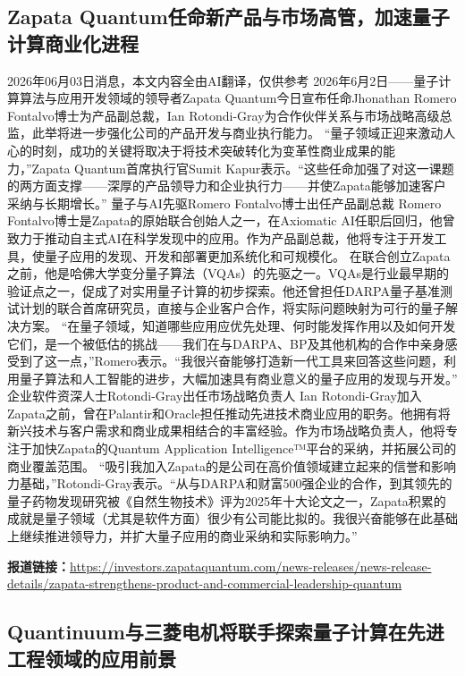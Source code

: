 \documentclass[12pt,a4paper]{ctexart}
\begin{document}
\subsection{ Zapata Quantum任命新产品与市场高管，加速量子计算商业化进程 }

2026年06月03日消息，本文内容全由AI翻译，仅供参考
2026年6月2日——量子计算算法与应用开发领域的领导者Zapata Quantum今日宣布任命Jhonathan Romero Fontalvo博士为产品副总裁，Ian Rotondi-Gray为合作伙伴关系与市场战略高级总监，此举将进一步强化公司的产品开发与商业执行能力。
“量子领域正迎来激动人心的时刻，成功的关键将取决于将技术突破转化为变革性商业成果的能力，”Zapata Quantum首席执行官Sumit Kapur表示。“这些任命加强了对这一课题的两方面支撑——深厚的产品领导力和企业执行力——并使Zapata能够加速客户采纳与长期增长。”
量子与AI先驱Romero Fontalvo博士出任产品副总裁
Romero Fontalvo博士是Zapata的原始联合创始人之一，在Axiomatic AI任职后回归，他曾致力于推动自主式AI在科学发现中的应用。作为产品副总裁，他将专注于开发工具，使量子应用的发现、开发和部署更加系统化和可规模化。
在联合创立Zapata之前，他是哈佛大学变分量子算法（VQAs）的先驱之一。VQAs是行业最早期的验证点之一，促成了对实用量子计算的初步探索。他还曾担任DARPA量子基准测试计划的联合首席研究员，直接与企业客户合作，将实际问题映射为可行的量子解决方案。
“在量子领域，知道哪些应用应优先处理、何时能发挥作用以及如何开发它们，是一个被低估的挑战——我们在与DARPA、BP及其他机构的合作中亲身感受到了这一点，”Romero表示。“我很兴奋能够打造新一代工具来回答这些问题，利用量子算法和人工智能的进步，大幅加速具有商业意义的量子应用的发现与开发。”
企业软件资深人士Rotondi-Gray出任市场战略负责人
Ian Rotondi-Gray加入Zapata之前，曾在Palantir和Oracle担任推动先进技术商业应用的职务。他拥有将新兴技术与客户需求和商业成果相结合的丰富经验。作为市场战略负责人，他将专注于加快Zapata的Quantum Application Intelligence™平台的采纳，并拓展公司的商业覆盖范围。
“吸引我加入Zapata的是公司在高价值领域建立起来的信誉和影响力基础，”Rotondi-Gray表示。“从与DARPA和财富500强企业的合作，到其领先的量子药物发现研究被《自然生物技术》评为2025年十大论文之一，Zapata积累的成就是量子领域（尤其是软件方面）很少有公司能比拟的。我很兴奋能够在此基础上继续推进领导力，并扩大量子应用的商业采纳和实际影响力。”

\noindent\textbf{报道链接：}\url{https://investors.zapataquantum.com/news-releases/news-release-details/zapata-strengthens-product-and-commercial-leadership-quantum}

\subsection{ Quantinuum与三菱电机将联手探索量子计算在先进工程领域的应用前景 }
\end{document}
